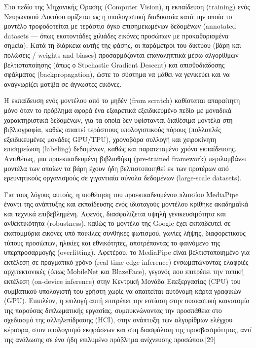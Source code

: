 \documentclass[twoside, a4paper, 11pt]{article}
\begin{document}
Στο πεδίο της Μηχανικής Όρασης (Computer Vision), η εκπαίδευση (training) ενός Νευρωνικού Δικτύου ορίζεται ως η υπολογιστική διαδικασία κατά την οποία το μοντέλο τροφοδοτείται με τεράστιο
όγκο επισημειωμένων δεδομένων (annotated datasets — όπως εκατοντάδες χιλιάδες εικόνες προσώπων
με προκαθορισμένα σημεία). Κατά τη διάρκεια αυτής της φάσης, οι παράμετροι του δικτύου (βάρη και
πολώσεις / weights and biases) προσαρμόζονται επαναληπτικά μέσω αλγορίθμων βελτιστοποίησης (όπως
ο Stochastic Gradient Descent) και οπισθοδιάδοσης σφάλματος (backpropagation), ώστε το σύστημα να
μάθει να γενικεύει και να αναγνωρίζει μοτίβα σε άγνωστες εικόνες.

Η εκπαίδευση ενός μοντέλου από το μηδέν (from scratch) καθίσταται απαραίτητη μόνο όταν το πρόβλημα αφορά ένα εξαιρετικά εξειδικευμένο πεδίο με μοναδικά χαρακτηριστικά δεδομένων, για τα οποία
δεν υφίστανται διαθέσιμα μοντέλα στη βιβλιογραφία, καθώς απαιτεί τεράστιους υπολογιστικούς πόρους
(πολλαπλές εξειδικευμένες μονάδες GPU/TPU), χρονοβόρα συλλογή και χειροκίνητη επισημείωση (labeling) δεδομένων, καθώς και παρατεταμένο χρόνο εκπαίδευσης. Αντιθέτως, μια προεκπαιδευμένη βιβλιοθήκη (pre-trained framework) περιλαμβάνει μοντέλα των οποίων τα βάρη έχουν ήδη βελτιστοποιηθεί
εκ των προτέρων από ερευνητικούς οργανισμούς σε γιγαντιαία σύνολα δεδομένων (large-scale datasets).

Για τους λόγους αυτούς, η υιοθέτηση του προεκπαιδευμένου πλαισίου MediaPipe έναντι της ανάπτυξης
και εκπαίδευσης ενός ιδιοταγούς μοντέλου κρίθηκε ακαδημαϊκά και τεχνικά επιβεβλημένη. Αφενός, διασφαλίζεται υψηλή γενικευσιμότητα και ανθεκτικότητα (robustness), καθώς το μοντέλο της Google έχει
εκπαιδευτεί σε εκατομμύρια εικόνες υπό ποικίλες συνθήκες φωτισμού, γωνίες λήψης, διαφορετικούς
τύπους προσώπων, ηλικίες και εθνικότητες, αποτρέποντας το φαινόμενο της υπερπροσαρμογής (overfitting). Αφετέρου, το MediaPipe είναι βελτιστοποιημένο για εκτέλεση σε πραγματικό χρόνο (real-time
edge inference) ενσωματώνοντας ελαφριές αρχιτεκτονικές (όπως MobileNet και BlazeFace), γεγονός που
επιτρέπει την τοπική εκτέλεση (on-device inference) στην Κεντρική Μονάδα Επεξεργασίας (CPU) του
συμβατικού υπολογιστή του χρήστη χωρίς να απαιτείται αυτόνομη κάρτα γραφικών (GPU). Επιπλέον, η
επιλογή αυτή επιτρέπει την εστίαση στην ουσιαστική καινοτομία της παρούσας διπλωματικής εργασίας,
συμπυκνώνοντας την προσπάθεια στο σχεδιασμό της αλληλεπίδρασης (HCI), στην ανάπτυξη των αλγορίθμων ελέγχου κέρσορα, στον υπολογισμό εκφράσεων και στη διασφάλιση της προσβασιμότητας, αντί
της ανάλωσης σε ένα ήδη επιλυμένο πρόβλημα ανίχνευσης προσώπου.[29]
\end{document}
